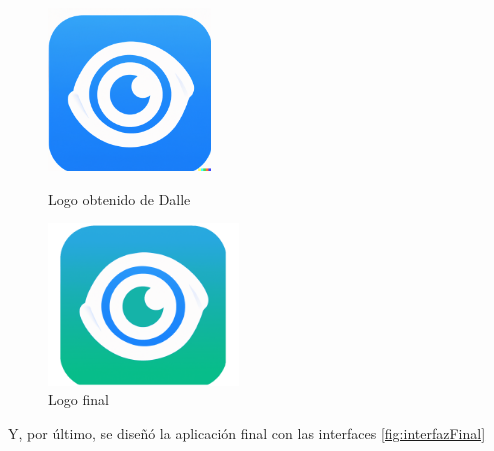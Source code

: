 \begin{figure}[!ht]
    \centering
    \begin{minipage}[t]{0.45\textwidth}
        \centering
        \includegraphics[width=0.385\textwidth]{img/logoDalle.png}
        \caption{Logo obtenido de  Dalle}
        \label{fig:logoDalle}
    \end{minipage}\hfill
    \begin{minipage}[t]{0.45\textwidth}
        \centering
        \includegraphics[width=0.45\textwidth]{img/logo.png}
        \caption{Logo final}
        \label{fig:logo}
    \end{minipage}
\end{figure}

Y, por último, se diseñó la aplicación final con las interfaces \ref{fig:interfazFinal}

